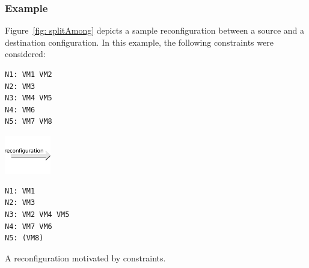 \subsubsection{Example}

Figure~\ref{fig: splitAmong} depicts a sample reconfiguration between a source and a destination configuration. In this example, the following  constraints were considered:

\begin{reconfiguration}
\centering
\begin{minipage}[b]{0.40\textwidth}
\begin{lstlisting}
N1: VM1 VM2
N2: VM3
N3: VM4 VM5
N4: VM6
N5: VM7 VM8
\end{lstlisting}
\end{minipage}
\begin{minipage}[b]{2cm}
\includegraphics[width=2cm]{img/arrow_reconfiguration}
\end{minipage}
\begin{minipage}[b]{0.40\textwidth}
\begin{lstlisting}
N1: VM1
N2: VM3
N3: VM2 VM4 VM5
N4: VM7 VM6
N5: (VM8)
\end{lstlisting}
\end{minipage}
\caption{A reconfiguration motivated by  constraints.}\label{fig: splitAmong}
\end{reconfiguration}


